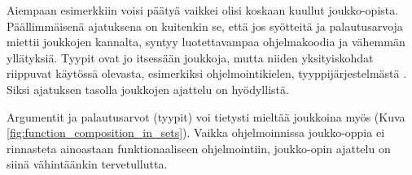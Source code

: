Aiempaan esimerkkiin voisi päätyä vaikkei olisi koskaan kuullut joukko-opista. Päällimmäisenä ajatuksena on kuitenkin se, että jos syötteitä ja palautusarvoja miettii joukkojen kannalta, syntyy luotettavampaa ohjelmakoodia ja vähemmän yllätyksiä. Tyypit ovat jo itsessään joukkoja, mutta niiden yksityiskohdat riippuvat käytössä olevasta, esimerkiksi ohjelmointikielen, tyyppijärjestelmästä \cite{type_theory}. Siksi ajatuksen tasolla joukkojen ajattelu on hyödyllistä.

Argumentit ja palautusarvot (tyypit) voi tietysti mieltää joukkoina myös  (Kuva \ref{fig:function_composition_in_sets}). Vaikka ohjelmoinnissa joukko-oppia ei rinnasteta ainoastaan funktionaaliseen ohjelmointiin,  joukko-opin ajattelu on siinä vähintäänkin tervetullutta.

